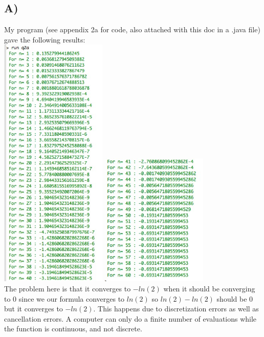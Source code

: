 \documentclass[12pt]{article}
\begin{document}
\subsection{A)}
My program (see appendix 2a for code, also attached with this doc in a .java file) gave the following results:\\
\includegraphics[width=2in]{q2a1}
\includegraphics[width=2in]{q2a2}\\
The problem here is that it converges to $-ln(2)$ when it should be converging to $0$ since we our formula converges to $ln(2)$ so $ln(2)-ln(2)$ should be $0$ but it converges to $-ln(2)$. This happens due to discretization errors as well as cancellation errors. A computer can only do a finite number of evaluations while the function is continuous, and not discrete. 
\end{document}

